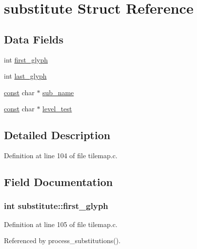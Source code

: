 \hypertarget{structsubstitute}{\section{substitute Struct Reference}
\label{structsubstitute}
}
\subsection*{Data Fields}
\begin{DoxyCompactItemize}
\item 
int \hyperlink{structsubstitute_a4069d47678c7a71b535b788978373c36}{first\+\_\+glyph}
\item 
int \hyperlink{structsubstitute_a535e9fe4f8931d2fb69f21c57b9aebab}{last\+\_\+glyph}
\item 
\hyperlink{tradstdc_8h_a2c212835823e3c54a8ab6d95c652660e}{const} char $\ast$ \hyperlink{structsubstitute_ab99ffe46a4c110c1ea1a64f0a9ff4a99}{sub\+\_\+name}
\item 
\hyperlink{tradstdc_8h_a2c212835823e3c54a8ab6d95c652660e}{const} char $\ast$ \hyperlink{structsubstitute_ad843568440ff0c5acefadbaa821bdbbe}{level\+\_\+test}
\end{DoxyCompactItemize}


\subsection{Detailed Description}


Definition at line 104 of file tilemap.\+c.



\subsection{Field Documentation}
\hypertarget{structsubstitute_a4069d47678c7a71b535b788978373c36}{
\subsubsection[{first\+\_\+glyph}]{\setlength{\rightskip}{0pt plus 5cm}int substitute\+::first\+\_\+glyph}}\label{structsubstitute_a4069d47678c7a71b535b788978373c36}


Definition at line 105 of file tilemap.\+c.



Referenced by process\+\_\+substitutions().

